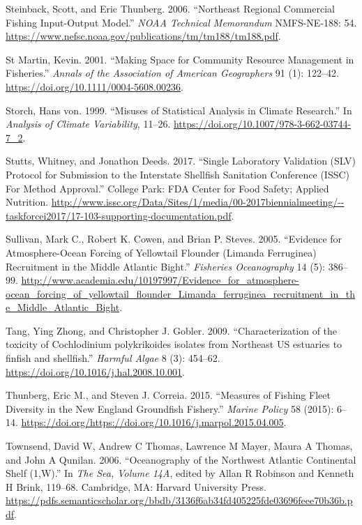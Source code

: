 \documentclass[
]{book}
\begin{document}
\leavevmode\hypertarget{ref-steinback_scott_northeast_2006}{}%
Steinback, Scott, and Eric Thunberg. 2006. ``Northeast Regional Commercial Fishing Input-Output Model.'' \emph{NOAA Technical Memorandum} NMFS-NE-188: 54. \url{https://www.nefsc.noaa.gov/publications/tm/tm188/tm188.pdf}.

\leavevmode\hypertarget{ref-st_martin_making_2001}{}%
St Martin, Kevin. 2001. ``Making Space for Community Resource Management in Fisheries.'' \emph{Annals of the Association of American Geographers} 91 (1): 122--42. \url{https://doi.org/10.1111/0004-5608.00236}.

\leavevmode\hypertarget{ref-VonStorch1999a}{}%
Storch, Hans von. 1999. ``Misuses of Statistical Analysis in Climate Research.'' In \emph{Analysis of Climate Variability}, 11--26. \url{https://doi.org/10.1007/978-3-662-03744-7_2}.

\leavevmode\hypertarget{ref-Stutts2017}{}%
Stutts, Whitney, and Jonathon Deeds. 2017. ``Single Laboratory Validation (SLV) Protocol for Submission to the Interstate Shellfish Sanitation Conference (ISSC) For Method Approval.'' College Park: FDA Center for Food Safety; Applied Nutrition. \url{http://www.issc.org/Data/Sites/1/media/00-2017biennialmeeting/--taskforcei2017/17-103-supporting-documentation.pdf}.

\leavevmode\hypertarget{ref-sullivan_evidence_2005}{}%
Sullivan, Mark C., Robert K. Cowen, and Brian P. Steves. 2005. ``Evidence for Atmosphere-Ocean Forcing of Yellowtail Flounder (Limanda Ferruginea) Recruitment in the Middle Atlantic Bight.'' \emph{Fisheries Oceanography} 14 (5): 386--99. \url{http://www.academia.edu/10197997/Evidence_for_atmosphere-ocean_forcing_of_yellowtail_flounder_Limanda_ferruginea_recruitment_in_the_Middle_Atlantic_Bight}.

\leavevmode\hypertarget{ref-Tang2009}{}%
Tang, Ying Zhong, and Christopher J. Gobler. 2009. ``Characterization of the toxicity of Cochlodinium polykrikoides isolates from Northeast US estuaries to finfish and shellfish.'' \emph{Harmful Algae} 8 (3): 454--62. \url{https://doi.org/10.1016/j.hal.2008.10.001}.

\leavevmode\hypertarget{ref-eric_m_thunberg_measures_2015}{}%
Thunberg, Eric M., and Steven J. Correia. 2015. ``Measures of Fishing Fleet Diversity in the New England Groundfish Fishery.'' \emph{Marine Policy} 58 (2015): 6--14. \url{https://doi.org/https://doi.org/10.1016/j.marpol.2015.04.005}.

\leavevmode\hypertarget{ref-townsend_oceanography_2006}{}%
Townsend, David W, Andrew C Thomas, Lawrence M Mayer, Maura A Thomas, and John A Qunilan. 2006. ``Oceanography of the Northwest Atlantic Continental Shelf (1,W).'' In \emph{The Sea, Volume 14A}, edited by Allan R Robinson and Kenneth H Brink, 119--68. Cambridge, MA: Harvard University Press. \url{https://pdfs.semanticscholar.org/bbdb/3136f6ab34fd405225fde03696feee70b36b.pdf}.
\end{document}
